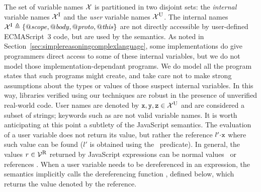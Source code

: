 \documentclass{article}
\begin{document}
%

%

%
The set of variable names $\mathcal{X}$ is partitioned in two disjoint sets: the  {\em internal} variable names $\mathcal{X}^{{\mbox{\textsc{i}}}}$ and the {\em user } variable names $\mathcal{X}^{{\mbox{\textsc{u}}}}$.
%
The internal names $\mathcal{X}^{{\mbox{\textsc{i}}}}\triangleq
\{\mathit{@scope},\mathit{@body},\mathit{@proto},\mathit{@this}\}$ are not directly accessible by
user-defined ECMAScript~3 code, but are used by the semantics. As
noted in Section~\ref{sec:simplereasoningcomplexlanguage}, some
implementations do give programmers direct access to some of these
internal variables, but we do not  model those implementation-dependant programs. We do model 
all the program states that such  programs might create, and take
care not to make strong assumptions about the types or values of those
suspect internal variables. In this way, libraries verified using our
techniques are robust in the presence of unverified real-world code.
%
User names are denoted by $\mbox{\texttt{{\upshape x}}},\mbox{\texttt{{\upshape y}}},\mbox{\texttt{{\upshape z}}}\in\mathcal{X}^{{\mbox{\textsc{u}}}}$ and are considered a subset of strings;
keywords such as  are not valid variable names.
%
%
It is worth anticipating at this point a subtlety of the JavaScript semantics.
%
The evaluation of a user variable  does not return its value, but rather the reference $l'\sv\js{x}$ where such value can be found ($l'$ is obtained using the \scope\ predicate).
%
In general, the values $r\in\mathcal{V}^{{\mbox{\textsc{r}}}}$ returned by JavaScript expressions can be normal values \vals\ or references .
%
When a user variable  needs to be dereferenced in an expression, the semantics implicitly calls the dereferencing  function \getValue,  defined below, which returns the value denoted by the reference.

\newpage
\end{document}
